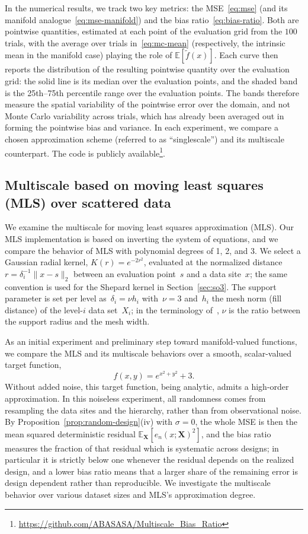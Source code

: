 \documentclass[12pt]{article}
\newcommand{\E}{{\mathbb{E}}}
\begin{document}
In the numerical results, we track two key metrics: the MSE~\eqref{eq:mse} (and its manifold analogue~\eqref{eq:mse-manifold}) and the bias ratio~\eqref{eq:bias-ratio}. Both are pointwise quantities, estimated at each point of the evaluation grid from the $100$ trials, with the average over trials in~\eqref{eq:mc-mean} (respectively, the intrinsic mean in the manifold case) playing the role of $\E[\widetilde f(x)]$. Each curve then reports the distribution of the resulting pointwise quantity over the evaluation grid: the solid line is its median over the evaluation points, and the shaded band is the 25th--75th percentile range over the evaluation points. The bands therefore measure the spatial variability of the pointwise error over the domain, and not Monte Carlo variability across trials, which has already been averaged out in forming the pointwise bias and variance. In each experiment, we compare a chosen approximation scheme (referred to as ``singlescale'') and its multiscale counterpart. The code is publicly available\footnote{\url{https://github.com/ABASASA/Multiscale_Bias_Ratio}}.

\subsection{Multiscale based on moving least squares (MLS) over scattered data} \label{sec:mls}

We examine the multiscale for moving least squares approximation (MLS). Our MLS implementation is based on inverting the system of equations, and we compare the behavior of MLS with polynomial degrees of 1, 2, and 3. We select a Gaussian radial kernel, $K(r)=e^{-2r^2}$, evaluated at the normalized distance $r=\delta_i^{-1}\|x-s\|_2$ between an evaluation point~$s$ and a data site~$x$; the same convention is used for the Shepard kernel in Section~\ref{sec:so3}. The support parameter is set per level as~$\delta_i=\nu h_i$ with~$\nu=3$ and~$h_i$ the mesh norm (fill distance) of the level-$i$ data set~$X_i$; in the terminology of~\cite{durst2026improved}, $\nu$ is the ratio between the support radius and the mesh width.

As an initial experiment and preliminary step toward manifold-valued functions, we compare the MLS and its multiscale behaviors over a smooth, scalar-valued target function,
\begin{equation}\label{eq:mls-target}
f(x,y) = e^{x^2 +  y^2} + 3 .
\end{equation}
Without added noise, this target function, being analytic, admits a high-order approximation. In this noiseless experiment, all randomness comes from resampling the data sites and the hierarchy, rather than from observational noise. By Proposition~\ref{prop:random-design}(iv) with $\sigma=0$, the whole MSE is then the mean squared deterministic residual $\E_{\mathbf X}[e_n(x;\mathbf X)^2]$, and the bias ratio measures the fraction of that residual which is systematic across designs; in particular it is strictly below one whenever the residual depends on the realized design, and a lower bias ratio means that a larger share of the remaining error is design dependent rather than reproducible. We investigate the multiscale behavior over various dataset sizes and MLS's approximation degree.
\end{document}
